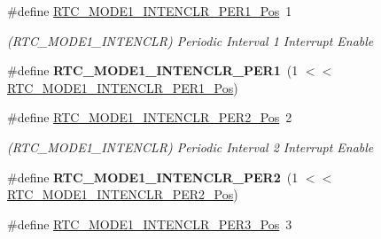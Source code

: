 \begin{DoxyCompactItemize}
\item 
\hypertarget{group___s_a_m_l21___r_t_c_ga0482a6669f2b770a2d4d64fcf9a52a52}{}\#define \hyperlink{group___s_a_m_l21___r_t_c_ga0482a6669f2b770a2d4d64fcf9a52a52}{R\+T\+C\+\_\+\+M\+O\+D\+E1\+\_\+\+I\+N\+T\+E\+N\+C\+L\+R\+\_\+\+P\+E\+R1\+\_\+\+Pos}~1\label{group___s_a_m_l21___r_t_c_ga0482a6669f2b770a2d4d64fcf9a52a52}

\begin{DoxyCompactList}\small\item\em (R\+T\+C\+\_\+\+M\+O\+D\+E1\+\_\+\+I\+N\+T\+E\+N\+C\+L\+R) Periodic Interval 1 Interrupt Enable \end{DoxyCompactList}\item 
\hypertarget{group___s_a_m_l21___r_t_c_gad568792d508e2b8b184c4492f01c7136}{}\#define {\bfseries R\+T\+C\+\_\+\+M\+O\+D\+E1\+\_\+\+I\+N\+T\+E\+N\+C\+L\+R\+\_\+\+P\+E\+R1}~(1 $<$$<$ \hyperlink{group___s_a_m_l21___r_t_c_ga0482a6669f2b770a2d4d64fcf9a52a52}{R\+T\+C\+\_\+\+M\+O\+D\+E1\+\_\+\+I\+N\+T\+E\+N\+C\+L\+R\+\_\+\+P\+E\+R1\+\_\+\+Pos})\label{group___s_a_m_l21___r_t_c_gad568792d508e2b8b184c4492f01c7136}

\item 
\hypertarget{group___s_a_m_l21___r_t_c_ga2671b39af28adcc35f7cedac9394086a}{}\#define \hyperlink{group___s_a_m_l21___r_t_c_ga2671b39af28adcc35f7cedac9394086a}{R\+T\+C\+\_\+\+M\+O\+D\+E1\+\_\+\+I\+N\+T\+E\+N\+C\+L\+R\+\_\+\+P\+E\+R2\+\_\+\+Pos}~2\label{group___s_a_m_l21___r_t_c_ga2671b39af28adcc35f7cedac9394086a}

\begin{DoxyCompactList}\small\item\em (R\+T\+C\+\_\+\+M\+O\+D\+E1\+\_\+\+I\+N\+T\+E\+N\+C\+L\+R) Periodic Interval 2 Interrupt Enable \end{DoxyCompactList}\item 
\hypertarget{group___s_a_m_l21___r_t_c_ga19bf3c62371467b18743e70ddf28734c}{}\#define {\bfseries R\+T\+C\+\_\+\+M\+O\+D\+E1\+\_\+\+I\+N\+T\+E\+N\+C\+L\+R\+\_\+\+P\+E\+R2}~(1 $<$$<$ \hyperlink{group___s_a_m_l21___r_t_c_ga2671b39af28adcc35f7cedac9394086a}{R\+T\+C\+\_\+\+M\+O\+D\+E1\+\_\+\+I\+N\+T\+E\+N\+C\+L\+R\+\_\+\+P\+E\+R2\+\_\+\+Pos})\label{group___s_a_m_l21___r_t_c_ga19bf3c62371467b18743e70ddf28734c}

\item 
\hypertarget{group___s_a_m_l21___r_t_c_ga414d45cfd0db35498bf791ab099cc48c}{}\#define \hyperlink{group___s_a_m_l21___r_t_c_ga414d45cfd0db35498bf791ab099cc48c}{R\+T\+C\+\_\+\+M\+O\+D\+E1\+\_\+\+I\+N\+T\+E\+N\+C\+L\+R\+\_\+\+P\+E\+R3\+\_\+\+Pos}~3\label{group___s_a_m_l21___r_t_c_ga414d45cfd0db35498bf791ab099cc48c}


\end{DoxyCompactItemize}
